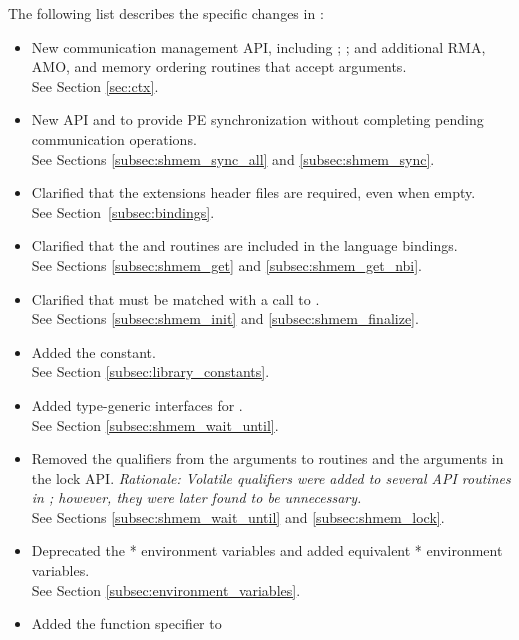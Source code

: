 The following list describes the specific changes in \openshmem[1.4]:
\begin{itemize}
%
\item New communication management API, including ;
    ; and additional RMA, AMO, and memory ordering
    routines that accept  arguments.
\\See Section \ref{sec:ctx}.
%
\item New API  and  to provide \ac{PE}
    synchronization without completing pending communication operations.
    \\See Sections \ref{subsec:shmem_sync_all} and \ref{subsec:shmem_sync}.
%
\item Clarified that the \openshmem extensions header files are required, even when empty.
\\See Section~\ref{subsec:bindings}.
%
\item Clarified that the  and 
    routines are included in the \Fortran language bindings.\\
    See Sections \ref{subsec:shmem_get} and \ref{subsec:shmem_get_nbi}.
%
\item Clarified that  must be matched with a call to
    .
\\See Sections \ref{subsec:shmem_init} and \ref{subsec:shmem_finalize}.
%
\item Added the  constant.
\\See Section \ref{subsec:library_constants}.
%
\item Added type-generic interfaces for .
\\ See Section \ref{subsec:shmem_wait_until}.
%
\item Removed the  qualifiers from the  arguments to
 routines and the  arguments in the lock API.
\emph{Rationale: Volatile qualifiers were added to several API routines in
\openshmem[1.3]; however, they were later found to be unnecessary.}
\\ See Sections \ref{subsec:shmem_wait_until} and \ref{subsec:shmem_lock}.
%
\item Deprecated the * environment variables and added equivalent
* environment variables.
\\ See Section \ref{subsec:environment_variables}.
%
\item Added the \Cstd[11]  function specifier to

\end{itemize}
